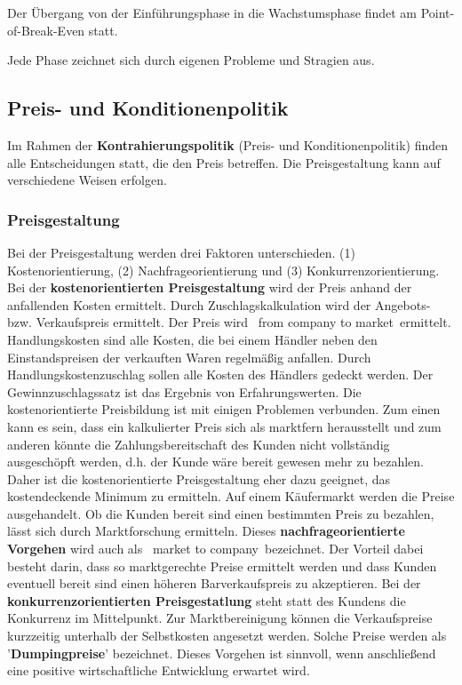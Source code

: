 Der Übergang von der Einführungsphase in die Wachstumsphase findet am Point-of-Break-Even statt.


Jede Phase zeichnet sich durch eigenen Probleme und Stragien aus.

\subsection{Preis- und Konditionenpolitik}

Im Rahmen der {\bf Kontrahierungspolitik} (Preis- und Konditionenpolitik) finden alle Entscheidungen statt, die den Preis betreffen. Die Preisgestaltung kann auf verschiedene Weisen erfolgen.

\subsubsection{Preisgestaltung}

Bei der Preisgestaltung werden drei Faktoren unterschieden. (1) Kostenorientierung, (2) Nachfrageorientierung und (3) Konkurrenzorientierung. Bei der {\bf kostenorientierten Preisgestaltung} wird der Preis anhand der anfallenden Kosten ermittelt. Durch Zuschlagskalkulation wird der Angebots- bzw. Verkaufspreis ermittelt. Der Preis wird \qr\ from company to market\qr\ ermittelt. Handlungskosten sind alle Kosten, die bei einem Händler neben den Einstandspreisen der verkauften Waren regelmäßig anfallen. Durch Handlungskostenzuschlag sollen alle Kosten des Händlers gedeckt werden. Der Gewinnzuschlagssatz ist das Ergebnis von Erfahrungswerten. Die kostenorientierte Preisbildung ist mit einigen Problemen verbunden. Zum einen kann es sein, dass ein kalkulierter Preis sich als marktfern herausstellt und zum anderen könnte die Zahlungsbereitschaft des Kunden nicht vollständig ausgeschöpft werden, d.h. der Kunde wäre bereit gewesen mehr zu bezahlen. Daher ist die kostenorientierte Preisgestaltung eher dazu geeignet, das kostendeckende Minimum zu ermitteln. Auf einem Käufermarkt werden die Preise ausgehandelt. Ob die Kunden bereit sind einen bestimmten Preis zu bezahlen, lässt sich durch Marktforschung ermitteln. Dieses {\bf nachfrageorientierte Vorgehen} wird auch als \qr\ market to company\qr\ bezeichnet. Der Vorteil dabei besteht darin, dass so marktgerechte Preise ermittelt werden und dass Kunden eventuell bereit sind einen höheren Barverkaufspreis zu akzeptieren. Bei der {\bf konkurrenzorientierten Preisgestatlung} steht statt des Kundens die Konkurrenz im Mittelpunkt. Zur Marktbereinigung können die Verkaufspreise kurzzeitig unterhalb der Selbstkosten angesetzt werden. Solche Preise werden als '{\bf Dumpingpreise}' bezeichnet. Dieses Vorgehen ist sinnvoll, wenn anschließend eine positive wirtschaftliche Entwicklung erwartet wird.

